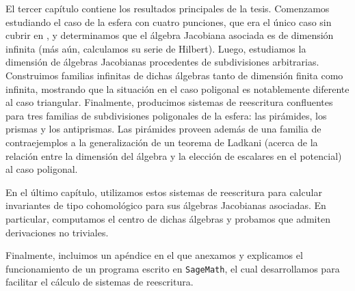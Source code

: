 \begin{chapter}
El tercer capítulo contiene los resultados principales de la tesis. Comenzamos estudiando el caso de la esfera con cuatro punciones, que era el único caso sin cubrir en \cite{Lad12}, y determinamos que el álgebra Jacobiana asociada es de dimensión infinita (más aún, calculamos su serie de Hilbert). Luego, estudiamos la dimensión de álgebras Jacobianas procedentes de subdivisiones arbitrarias. Construimos familias infinitas de dichas álgebras tanto de dimensión finita como infinita, mostrando que la situación en el caso poligonal es notablemente diferente al caso triangular. Finalmente, producimos sistemas de reescritura confluentes para tres familias de subdivisiones poligonales de la esfera: las pirámides, los prismas y los antiprismas. Las pirámides proveen además de una familia de contraejemplos a la generalización de un teorema de Ladkani (acerca de la relación entre la dimensión del álgebra y la elección de escalares en el potencial) al caso poligonal.

En el último capítulo, utilizamos estos sistemas de reescritura para calcular invariantes de tipo cohomológico para sus álgebras Jacobianas asociadas. En particular, computamos el centro de dichas álgebras y probamos que admiten derivaciones no triviales.

Finalmente, incluimos un apéndice en el que anexamos y explicamos el funcionamiento de un programa escrito en \texttt{SageMath}, el cual desarrollamos para facilitar el cálculo de sistemas de reescritura.
\end{chapter}